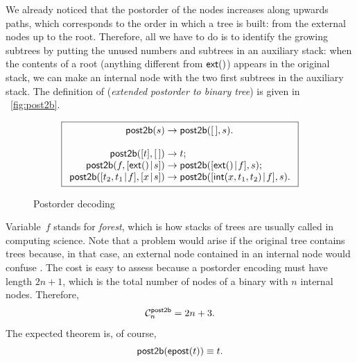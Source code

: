 We already noticed that the postorder of the nodes increases along
upwards paths, which corresponds to the order in which a tree is
built: from the external nodes up to the root. Therefore, all we have
to do is to identify the growing subtrees by putting the unused
numbers and subtrees in an auxiliary stack: when the contents of a
root (anything different from \(\textsf{ext}()\)) appears in the original
stack, we can make an internal node with the two first subtrees in the
auxiliary stack. The definition of
 (\emph{extended postorder
to binary tree}) is given in \fig~\vref{fig:post2b}.
\begin{figure}
\begin{equation*}
\boxed{
\begin{array}{r@{\;}c@{\;}l}
\fun{post2b}(s) & \rightarrow & \fun{post2b}(\el,s).\\
\\
\fun{post2b}([t],\el) & \rightarrow & t;\\
\fun{post2b}(f,\cons{\fun{ext}()}{s}) & \rightarrow & \fun{post2b}(\cons{\fun{ext}()}{f},s);\\
\fun{post2b}(\cons{t_2,t_1}{f},\cons{x}{s}) & \rightarrow & \fun{post2b}(\cons{\fun{int}(x,t_1,t_2)}{f},s).
\end{array}}
\end{equation*}
\caption{Postorder decoding}
\label{fig:post2b}
\end{figure}
Variable~\(f\) stands for \emph{forest}, which is
how stacks of trees are usually called in computing science. Note that
a problem would arise if the original tree contains trees because, in
that case, an external node contained in an internal node would
confuse . The cost is easy
to assess because a postorder encoding must have length \(2n+1\),
which is the total number of nodes of a binary with \(n\) internal
nodes. Therefore,
\begin{equation*}
  \C{\fun{post2b}}{n} = 2n + 3.
  \index{post2b@$\C{\fun{post2b}}{n}$}
\end{equation*}
The expected theorem is, of course,
\begin{equation}
\textsf{post2b}(\textsf{epost}(t)) \equiv t.
\label{thm:post2b_epost}
\end{equation}

